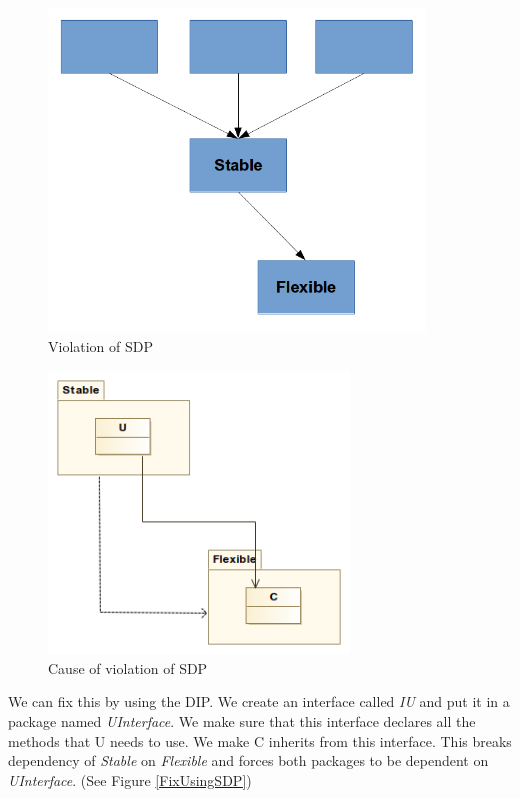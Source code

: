 \documentclass[12pt]{report}
\begin{document}
\begin{figure}[H]
    \centering
    \includegraphics[width=10cm]{uml/ViolateSDP.png}
    \caption{Violation of SDP}
    \label{ViolateSDP}
\end{figure}

\begin{figure}[H]
    \centering
    \includegraphics[width=8cm]{uml/cause-of-violation.png}
    \caption{Cause of violation of SDP}
    \label{CauseOfViolation}
\end{figure}

We can fix this by using the DIP. We create an interface called \textit{IU} and put it in a package named \textit{UInterface}. We make sure that this 
interface declares all the methods that U needs to use.
We make C inherits from this interface. This breaks dependency of 
\textit{Stable} on \textit{Flexible} and forces both packages to 
be dependent on \textit{UInterface}. (See Figure \ref{FixUsingSDP})
\end{document}
